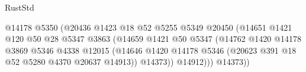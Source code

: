 \begin{lexlean}{RustStd}
\begin{coremodule}
                                                  @14178
                                                  @5350
                                                  (@20436
                                                    @1423
                                                    @18
                                                    @52
                                                    @5255
                                                    @5349
                                                    @20450
                                                    (@14651
                                                      @1421
                                                      @120
                                                      @50
                                                      @28
                                                      @5347
                                                      @3863
                                                      (@14659
                                                        @1421
                                                        @50
                                                        @5347
                                                        (@14762
                                                          @1420
                                                          @14178
                                                          @3869
                                                          @5346
                                                          @4338
                                                          @12015
                                                          (@14646
                                                            @1420
                                                            @14178
                                                            @5346
                                                            (@20623
                                                              @391
                                                              @18
                                                              @52
                                                              @5280
                                                              @4370
                                                              @20637
                                                              @14913))
                                                          @14373))
                                                      @14912)))
                                                @14373))

\end{coremodule}
\end{lexlean}
